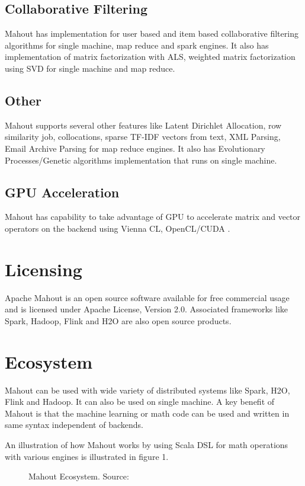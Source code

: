 \documentclass[9pt,twocolumn,twoside]{../../styles/osajnl}
\begin{document}
\subsection{Collaborative Filtering}
Mahout has implementation for user based and item based collaborative
filtering algorithms for single machine, map reduce and spark
engines. It also has implementation of matrix factorization with ALS,
weighted matrix factorization using SVD for single machine and map
reduce.

\subsection{Other}
Mahout supports several other features like Latent Dirichlet
Allocation, row similarity job, collocations, sparse TF-IDF vectors
from text, XML Parsing, Email Archive Parsing for map reduce \TE
engines. It also has Evolutionary Processes/Genetic algorithms
implementation that runs on single machine.

\subsection{GPU Acceleration}
Mahout has capability to take advantage of GPU to accelerate matrix
and vector operators on the backend using Vienna CL, OpenCL/CUDA \CE.


\section{Licensing}
Apache Mahout is an open source software available for free commercial
usage and is licensed under Apache License, Version
2.0\cite{www-mahoutLicense}. Associated frameworks like Spark,
  Hadoop, Flink and H2O are also open source products.




\section{Ecosystem}
Mahout can be used with wide variety of distributed systems like
Spark, H2O, Flink and Hadoop. It can also be used on single machine. A
key benefit of Mahout is that the machine learning or math code can be
used and written in same syntax independent of backends.

An illustration of how Mahout works by using Scala DSL for math
operations with various engines is illustrated in figure 1.

\begin{figure}[htbp]
\centering
{}
\caption{Mahout Ecosystem. \newline Source: \cite{www-weatheringDays}}
\label{fig:false-color}
\end{figure}
\end{document}
